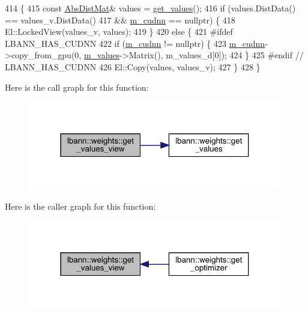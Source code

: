 \begin{DoxyCode}
414                                                   \{
415   \textcolor{keyword}{const} \hyperlink{base_8hpp_a9a697a504ae84010e7439ffec862b470}{AbsDistMat}& values = \hyperlink{classlbann_1_1weights_a09fa4082be905c0c124dde3033e2461b}{get\_values}();
416   \textcolor{keywordflow}{if} (values.DistData() == values\_v.DistData()
417       && \hyperlink{classlbann_1_1weights_a873e8c14998915e442d03b8dd7d2fdf7}{m\_cudnn} == \textcolor{keyword}{nullptr}) \{
418     El::LockedView(values\_v, values);
419   \}
420   \textcolor{keywordflow}{else} \{
421 \textcolor{preprocessor}{    #ifdef LBANN\_HAS\_CUDNN}
422     \textcolor{keywordflow}{if} (\hyperlink{classlbann_1_1weights_a873e8c14998915e442d03b8dd7d2fdf7}{m\_cudnn} != \textcolor{keyword}{nullptr}) \{
423       \hyperlink{classlbann_1_1weights_a873e8c14998915e442d03b8dd7d2fdf7}{m\_cudnn}->copy\_from\_gpu(0, \hyperlink{classlbann_1_1weights_a6b2df671b6d4c4dd595477971eea0543}{m\_values}->Matrix(), m\_values\_d[0]);
424     \}
425 \textcolor{preprocessor}{    #endif // LBANN\_HAS\_CUDNN}
426     El::Copy(values, values\_v);
427   \}
428 \}
\end{DoxyCode}
Here is the call graph for this function\+:\nopagebreak
\begin{figure}[H]
\begin{center}
\leavevmode
\includegraphics[width=315pt]{classlbann_1_1weights_a506b6445c46a92cdadad75caf1c166d3_cgraph}
\end{center}
\end{figure}
Here is the caller graph for this function\+:\nopagebreak
\begin{figure}[H]
\begin{center}
\leavevmode
\includegraphics[width=315pt]{classlbann_1_1weights_a506b6445c46a92cdadad75caf1c166d3_icgraph}
\end{center}
\end{figure}
\mbox{\label{classlbann_1_1weights_a5874876052191837679634186c64c388}} 
